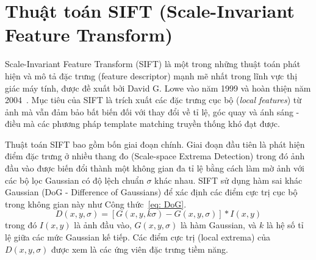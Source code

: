 \documentclass[a4paper, 12pt]{report}
\begin{document}


\section{Thuật toán SIFT (Scale-Invariant Feature Transform)}

Scale-Invariant Feature Transform (SIFT) \cite{Lindeberg:2012} là một trong những thuật toán phát hiện và mô tả đặc trưng (feature descriptor) mạnh mẽ nhất trong lĩnh vực thị giác máy tính, được đề xuất bởi David G. Lowe vào năm 1999 và hoàn thiện năm 2004~\cite{lowe2004distinctive}. Mục tiêu của SIFT là trích xuất các đặc trưng cục bộ (\textit{local features}) từ ảnh mà vẫn đảm bảo bất biến đối với thay đổi về tỉ lệ, góc quay và ánh sáng - điều mà các phương pháp template matching truyền thống khó đạt được.

Thuật toán SIFT bao gồm bốn giai đoạn chính. Giai đoạn đầu tiên là phát hiện điểm đặc trưng ở nhiều thang đo (Scale-space Extrema Detection) trong đó ảnh đầu vào được biến đổi thành một không gian đa tỉ lệ bằng cách làm mờ ảnh với các bộ lọc Gaussian có độ lệch chuẩn $\sigma$ khác nhau. SIFT sử dụng hàm sai khác Gaussian (DoG - Difference of Gaussians) để xác định các điểm cực trị cục bộ trong không gian này như Công thức~\ref{eq: DoG}.
\begin{equation}
    D(x, y, \sigma) = [G(x, y, k\sigma) - G(x, y, \sigma)] * I(x, y)
    \label{eq: DoG}
\end{equation}
    trong đó $I(x, y)$ là ảnh đầu vào, $G(x, y, \sigma)$ là hàm Gaussian, và $k$ là hệ số tỉ lệ giữa các mức Gaussian kế tiếp. Các điểm cực trị (local extrema) của $D(x, y, \sigma)$ được xem là các ứng viên đặc trưng tiềm năng.
\end{document}
